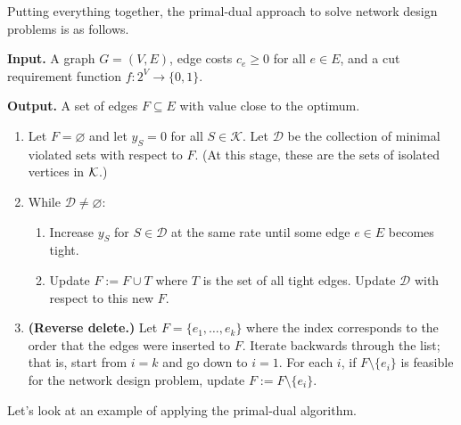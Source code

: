 Putting everything together, the primal-dual approach to solve network 
design problems is as follows.

\begin{mdframed}[
    linewidth=1pt,
    linecolor=black,
    bottomline=false,topline=false,rightline=false,
    innerrightmargin=0pt,innertopmargin=0pt,innerbottommargin=0pt,
    innerleftmargin=1em,%
    skipabove=0.75\baselineskip
]
{\bf Input.} A graph $G = (V, E)$, edge costs $c_e \geq 0$ for 
all $e \in E$, and a cut requirement function $f : 2^V \to \{0, 1\}$. 

{\bf Output.} A set of edges $F \subseteq E$ with value close to the optimum.
\begin{enumerate}[leftmargin=1.75cm, label={Step \arabic*.}]
    \item Let $F = \varnothing$ and let $y_S = 0$ for all $S \in \mathcal{K}$.
    Let $\mathcal{D}$ be the collection of minimal violated sets with respect 
    to $F$. (At this stage, these are the sets of isolated vertices in ${\cal K}$.)

    \item While $\mathcal{D} \neq \varnothing$:
    \begin{enumerate}[label={Step 2.\arabic*.}]
        \item Increase $y_S$ for $S \in \mathcal{D}$ at the same rate 
        until some edge $e \in E$ becomes tight.
        \item Update $F := F \cup T$ where $T$ is the set of all tight edges. 
        Update $\mathcal{D}$ with respect to this new $F$. 
    \end{enumerate}

    \item {\bf (Reverse delete.)} Let $F = \{e_1, \dots, e_k\}$ where the 
    index corresponds to the order that the edges were inserted to $F$. 
    Iterate backwards through the list; that is, start from $i = k$ 
    and go down to $i = 1$. For each $i$, if $F \setminus \{e_i\}$ is feasible 
    for the network design problem, update $F := F \setminus \{e_i\}$.
\end{enumerate}
\end{mdframed}\vspace{-0.25cm}
Let's look at an example of applying the primal-dual algorithm. 

